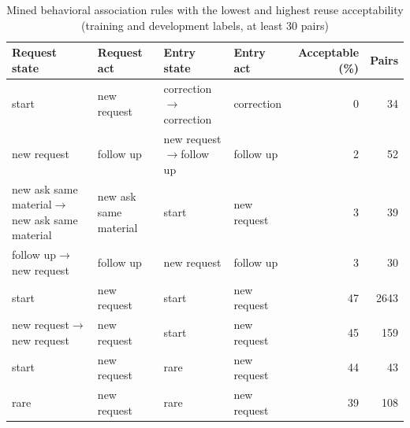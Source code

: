 \begin{table}[t]
\caption{Mined behavioral association rules with the lowest and highest reuse acceptability (training and development labels, at least 30 pairs)}
\label{tab:rules}
\centering
\footnotesize
\begin{tabular}{@{}llllrr@{}}
\toprule
Request state & Request act & Entry state & Entry act & Acceptable (\%) & Pairs \\
\midrule
start & new request & correction$\to$correction & correction & 0 & 34 \\
new request & follow up & new request$\to$follow up & follow up & 2 & 52 \\
new ask same material$\to$new ask same material & new ask same material & start & new request & 3 & 39 \\
follow up$\to$new request & follow up & new request & follow up & 3 & 30 \\
\midrule
start & new request & start & new request & 47 & 2643 \\
new request$\to$new request & new request & start & new request & 45 & 159 \\
start & new request & rare & new request & 44 & 43 \\
rare & new request & rare & new request & 39 & 108 \\
\bottomrule
\end{tabular}
\end{table}